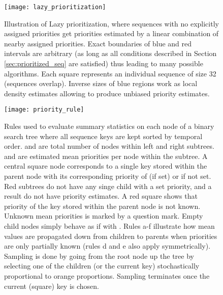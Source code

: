 \documentclass{article}
\begin{document}
\begin{figure}
\centering
\begin{minipage}{1.0\textwidth}  
  \centering
  \texttt{[image: lazy\_prioritization]}
  \caption{Illustration of Lazy prioritization, where sequences with no 
    explicitly assigned priorities get priorities estimated by a linear 
    combination of nearby assigned priorities. Exact boundaries of blue 
    and red intervals are arbitrary (as long as all conditions described in 
    Section \ref{sec:prioritized_seq} are satisfied) thus leading to many 
    possible algorithms. Each square represents an individual sequence of 
    size 32 (sequences overlap).
    Inverse sizes of blue regions work as local density estimates allowing to 
    produce unbiased priority estimates.}
  \label{lazy-prioritization}
\end{minipage}\end{figure}


\begin{figure}
\centering
\begin{minipage}{1.0\textwidth}  
  \centering
  \texttt{[image: priority\_rule]}
  \caption{Rules used to evaluate summary statistics on each node of a binary 
    search tree where all sequence keys are kept sorted by temporal order. 
     and  are total number of nodes within left and right subtrees. 
     and  are estimated mean priorities per node within the subtree. 
    A central square node corresponds to a single key stored within the parent 
    node with its corresponding priority of  (if set) or  if not set. 
    Red subtrees do not have any singe child with a set priority, and a result 
    do not have priority estimates. A red square shows that priority of the key 
    stored within the parent node is not known. Unknown mean priorities is 
    marked by a question mark. Empty child nodes simply behave as if  with 
    . Rules a-f illustrate how mean values are propagated down from 
    children to parents when priorities are only partially known (rules d and e 
    also apply symmetrically). Sampling is done by going from the root node up 
    the tree by selecting one of the children (or the current key) 
    stochastically proportional to orange proportions. Sampling terminates once 
    the current (square) key is chosen.}
  \label{priority-rule}
\end{minipage}\end{figure}
\end{document}

